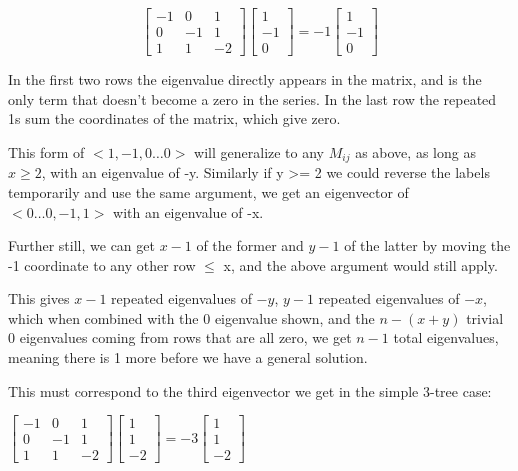 \documentclass[10pt,a4paper]{report}
\begin{document}
\begin{equation*}
\left[\begin{matrix}
	-1 & 0 & 1\\
	0 & -1 & 1\\
	1 & 1 & -2
\end{matrix}\right]
\left[\begin{matrix}
	1\\
	-1\\
	0
\end{matrix}\right]
=
-1
\left[\begin{matrix}
	1\\
	-1\\
	0
\end{matrix}\right]
\end{equation*}

In the first two rows the eigenvalue directly appears in the matrix, and is the
only term that doesn't become a zero in the series.
In the last row the repeated 1s sum the coordinates of the matrix, which give
zero.

This form of $<1, -1, 0\ldots 0>$ will generalize to any $M_{ij}$ as above, as
long as $x \geq 2$, with an eigenvalue of -y.
Similarly if y >= 2 we could reverse the labels temporarily and use the same
argument, we get an eigenvector of $<0\ldots 0, -1, 1>$ with an eigenvalue of
-x.

Further still, we can get $x-1$ of the former and $y-1$ of the latter by moving
the -1 coordinate to any other row $\leq$ x, and the above argument would still
apply.

This gives $x-1$ repeated eigenvalues of $-y$, $y-1$ repeated eigenvalues of
$-x$, which when combined with the 0 eigenvalue shown, and the $n - (x + y)$
trivial $0$ eigenvalues coming from rows that are all zero, we get $n-1$ total
eigenvalues, meaning there is 1 more before we have a general solution.

This must correspond to the third eigenvector we get in the simple 3-tree case:

$
\left[\begin{matrix}
	-1 & 0 & 1\\
	0 & -1 & 1\\
	1 & 1 & -2
\end{matrix}\right]
\left[\begin{matrix}
	1\\
	1\\
	-2
\end{matrix}\right]
=
-3
\left[\begin{matrix}
	1\\
	1\\
	-2
\end{matrix}\right]
$
\end{document}
